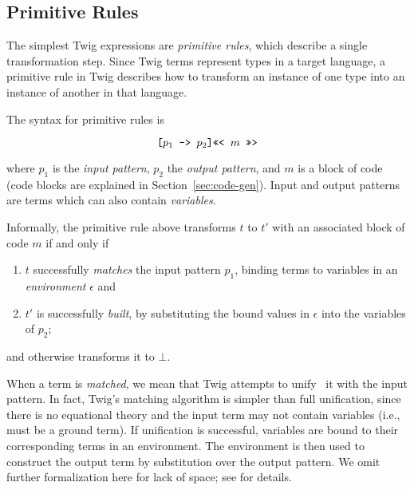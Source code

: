 
\subsection{Primitive Rules}
\label{sec:semantics:prims}

The simplest Twig expressions are \emph{primitive rules}, which
describe a single transformation step. Since Twig terms represent
types in a target language, a primitive rule in Twig describes how
to transform an instance of one type into an instance of another
in that language.

The syntax for primitive rules is

\[
\mbox{\texttt{[}} p_1 \mbox{\texttt{ -> }} p_2 \mbox{\texttt{]}} \mbox{\texttt{<<< }} m \mbox{\texttt{ >>>}}
\]

where $p_1$ is the \emph{input pattern}, $p_2$ the \emph{output
pattern}, and $m$ is a block of code (code blocks are explained in
Section~\ref{sec:code-gen}). Input and output patterns are terms
which can also contain \emph{variables}.

Informally, the primitive rule above transforms $t$ to $t'$ with
an associated block of code $m$ if and only if

\begin{enumerate}

\item $t$ successfully \emph{matches} the input pattern $p_1$,
binding terms to variables in an \emph{environment} $\epsilon$ and

\item $t'$ is successfully \emph{built}, by substituting the bound
values in $\epsilon$ into the variables of $p_2$;

\end{enumerate}

and otherwise transforms it to $\bot$.

When a term is \emph{matched}, we mean that Twig attempts to
unify~\cite{baader98rewriting} it with the input pattern. In fact,
Twig's matching algorithm is simpler than full unification, since
there is no equational theory and the input term may not contain
variables (i.e., must be a ground term). If unification is
successful, variables are bound to their corresponding terms in an
environment. The environment is then used to construct the output
term by substitution over the output pattern. We omit further
formalization here for lack of space; see
\cite{baader98rewriting,system-s} for details.


